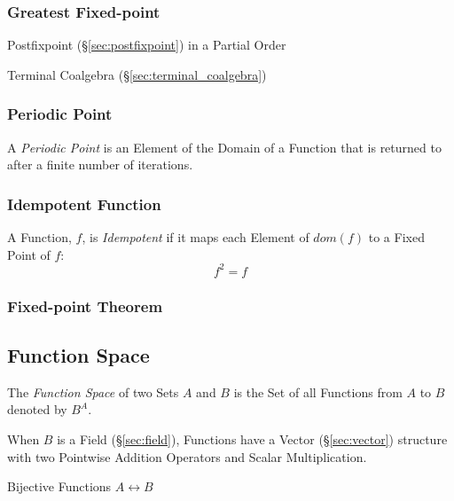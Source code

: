 \subsubsection{Greatest Fixed-point}\label{sec:greatest_fixedpoint}

Postfixpoint (\S\ref{sec:postfixpoint}) in a Partial Order

Terminal Coalgebra (\S\ref{sec:terminal_coalgebra})



\subsubsection{Periodic Point}\label{sec:periodic_point}

A \emph{Periodic Point} is an Element of the Domain of a Function that
is returned to after a finite number of iterations.



\subsubsection{Idempotent Function}\label{sec:idempotent}

A Function, $f$, is \emph{Idempotent} if it maps each Element of
$dom(f)$ to a Fixed Point of $f$:
\[
  f^2 = f
\]



\subsubsection{Fixed-point Theorem}\label{sec:fixedpoint_theorem}



\subsection{Function Space}\label{sec:function_space}

The \emph{Function Space} of two Sets $A$ and $B$ is the Set of all
Functions from $A$ to $B$ denoted by $B^A$.

When $B$ is a Field (\S\ref{sec:field}), Functions have a Vector
(\S\ref{sec:vector}) structure with two Pointwise Addition Operators
and Scalar Multiplication. %

Bijective Functions $A \leftrightarrow B$




